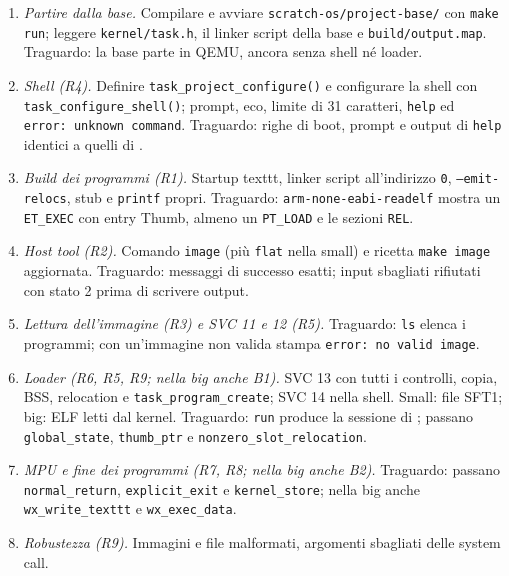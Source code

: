 \begin{enumerate}\sloppy
\item \emph{Partire dalla base.} Compilare e avviare \texttt{scratch-os/project-base/} con \texttt{make run}; leggere \texttt{kernel/task.h}, il linker script della base e \texttt{build/output.map}.\newline
Traguardo: la base parte in QEMU, ancora senza shell né loader.
\item \emph{Shell (R4).} Definire \texttt{task\_project\_configure()} e configurare la shell con \texttt{task\_configure\_shell()}; prompt, eco, limite di 31 caratteri, \texttt{help} ed \texttt{error:\ unknown command}.\newline
Traguardo: righe di boot, prompt e output di \texttt{help} identici a quelli di .
\item \emph{Build dei programmi (R1).} Startup texttt, linker script all'indirizzo \texttt{0}, \texttt{--emit-relocs}, stub e \texttt{printf} propri.\newline
Traguardo: \texttt{arm-none-eabi-readelf} mostra un \texttt{ET\_EXEC} con entry Thumb, almeno un \texttt{PT\_LOAD} e le sezioni \texttt{REL}.
\item \emph{Host tool (R2).} Comando \texttt{image} (più \texttt{flat} nella small) e ricetta \texttt{make image} aggiornata.\newline
Traguardo: messaggi di successo esatti; input sbagliati rifiutati con stato 2 prima di scrivere output.
\item \emph{Lettura dell'immagine (R3) e SVC 11 e 12 (R5).}\newline
Traguardo: \texttt{ls} elenca i programmi; con un'immagine non valida stampa \texttt{error:\ no valid image}.
\item \emph{Loader (R6, R5, R9; nella big anche B1).} SVC 13 con tutti i controlli, copia, BSS, relocation e \texttt{task\_program\_create}; SVC 14 nella shell. Small: file SFT1; big: ELF letti dal kernel.\newline
Traguardo: \texttt{run} produce la sessione di ; passano \texttt{global\_state}, \texttt{thumb\_ptr} e \texttt{nonzero\_slot\_relocation}.
\item \emph{MPU e fine dei programmi (R7, R8; nella big anche B2).}\newline
Traguardo: passano \texttt{normal\_return}, \texttt{explicit\_exit} e \texttt{kernel\_store}; nella big anche \texttt{wx\_write\_texttt} e \texttt{wx\_exec\_data}.
\item \emph{Robustezza (R9).} Immagini e file malformati, argomenti sbagliati delle system call.\newline

\end{enumerate}
